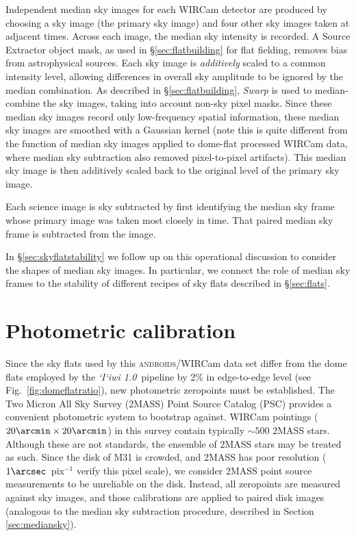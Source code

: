 \documentclass[iop]{emulateapj}
\newcommand{\sw}[1]{\textit{#1}} %
\newcommand{\iiwione}{\sw{`I`iwi 1.0}}
\newcommand{\androids}{\textsc{androids}}
\newcommand{\todo}[1]{\textcolor{BurntOrange}{\textsf{#1}}} %
\newcommand{\Fig}[1]{Fig.~\ref{fig:#1}}  %
\newcommand{\Sec}[1]{\S\ref{sec:#1}}  %
\begin{document}
Independent median sky images for each WIRCam detector are produced by choosing a sky image (the primary sky image) and four other sky images taken at adjacent times.
Across each image, the median sky intensity is recorded.
A Source Extractor object mask, as used in \Sec{flatbuilding} for flat fielding, removes bias from astrophysical sources.
Each sky image is \emph{additively} scaled to a common intensity level, allowing differences in overall sky amplitude to be ignored by the median combination.
As described in \Sec{flatbuilding}, \sw{Swarp} is used to median-combine the sky images, taking into account non-sky pixel masks.
Since these median sky images record only low-frequency spatial information, these median sky images are smoothed with a Gaussian kernel (note this is quite different from the function of median sky images applied to dome-flat processed WIRCam data, where median sky subtraction also removed pixel-to-pixel artifacts).
This median sky image is then additively scaled back to the original level of the primary sky image.

Each science image is sky subtracted by first identifying the median sky frame whose primary image was taken most closely in time.
That paired median sky frame is subtracted from the image.

In \Sec{skyflatstability} we follow up on this operational discussion to consider the shapes of median sky images. In particular, we connect the role of median sky frames to the stability of different recipes of sky flats described in \Sec{flats}.

\section{Photometric calibration}
\label{sec:photocal}

Since the sky flats used by this \androids/WIRCam data set differ from the dome flats employed by the \iiwione\ pipeline by 2\% in edge-to-edge level (see \Fig{domeflatratio}), new photometric zeropoints must be established.
The Two Micron All Sky Survey (2MASS) Point Source Catalog (PSC) \citep{Skrutskie:2006} provides a convenient photometric system to bootstrap against.
WIRCam pointings ($20\arcmin \times 20\arcmin$) in this survey contain typically $\sim 500$ 2MASS stars.
Although these are not standards, the ensemble of 2MASS stars may be treated as such.
Since the disk of M31 is crowded, and 2MASS has poor resolution ($1\arcsec$~pix$^{-1}$ \todo{verify this pixel scale}), we consider 2MASS point source measurements to be unreliable on the disk.
Instead, all zeropoints are measured against sky images, and those calibrations are applied to paired disk images (analogous to the median sky subtraction procedure, described in Section \ref{sec:mediansky}).
\end{document}
